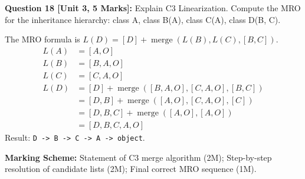 \noindent\textbf{Question 18 [Unit 3, 5 Marks]:} Explain C3 Linearization. Compute the MRO for the inheritance hierarchy: class A, class B(A), class C(A), class D(B, C).
\begin{solutionbox}
The MRO formula is $L(D) = [D] + \operatorname{merge}(L(B), L(C), [B, C])$.
\begin{align*}
L(A) &= [A, O] \\
L(B) &= [B, A, O] \\
L(C) &= [C, A, O] \\
L(D) &= [D] + \operatorname{merge}([B, A, O], [C, A, O], [B, C]) \\
     &= [D, B] + \operatorname{merge}([A, O], [C, A, O], [C]) \\
     &= [D, B, C] + \operatorname{merge}([A, O], [A, O]) \\
     &= [D, B, C, A, O]
\end{align*}
Result: \texttt{D -> B -> C -> A -> object}.
\end{solutionbox}
\begin{markingrubric}
\textbf{Marking Scheme:} Statement of C3 merge algorithm (2M); Step-by-step resolution of candidate lists (2M); Final correct MRO sequence (1M).
\end{markingrubric}
